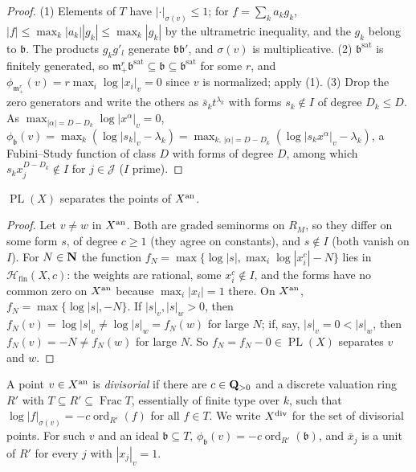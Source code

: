 \begin{proof}
(1) Elements of $T$ have $|\cdot|_{\sigma(v)}\le1$; for $f=\sum_ka_kg_k$, $|f|\le\max_k|a_k||g_k|\le\max_k|g_k|$ by the ultrametric
inequality, and the $g_k$ belong to $\mathfrak b$. The products $g_kg'_l$ generate $\mathfrak b\mathfrak b'$, and $\sigma(v)$ is multiplicative.
(2) $\mathfrak b^{\mathrm{sat}}$ is finitely generated, so $\mathfrak m_+^r\mathfrak b^{\mathrm{sat}}\subseteq\mathfrak b\subseteq\mathfrak b^{\mathrm{sat}}$ for some $r$,
and $\phi_{\mathfrak m_+^r}(v)=r\max_i\log|x_i|_v=0$ since $v$ is normalized; apply (1).
(3) Drop the zero generators and write the others as $\bar s_kt^{\lambda_k}$ with forms $s_k\notin I$ of degree $D_k\le D$. As
$\max_{|\alpha|=D-D_k}\log|x^\alpha|_v=0$,
$\phi_{\mathfrak b}(v)=\max_k(\log|s_k|_v-\lambda_k)=\max_{k,\,|\alpha|=D-D_k}(\log|s_kx^\alpha|_v-\lambda_k)$, a Fubini--Study function of class
$D$ with forms of degree $D$, among which $s_kx_j^{D-D_k}\notin I$ for $j\in\mathcal J$ ($I$ prime).
\end{proof}

\begin{lemma}\label{lem:sg-pl-separate}
\leanok
{}
$\operatorname{PL}(X)$ separates the points of $X^{\mathrm{an}}$.
\end{lemma}

\begin{proof}
Let $v\ne w$ in $X^{\mathrm{an}}$. Both are graded seminorms on $R_M$, so they differ on some form $s$, of degree $c\ge1$ (they agree
on constants), and $s\notin I$ (both vanish on $I$). For $N\in\mathbf{N}$ the function
$f_N=\max\{\log|s|,\max_i\log|x_i^c|-N\}$ lies in $\mathcal H_{\mathrm{fin}}(X,c)$: the weights are rational, some $x_i^c\notin I$, and
the forms have no common zero on $X^{\mathrm{an}}$ because $\max_i|x_i|=1$ there. On $X^{\mathrm{an}}$, $f_N=\max\{\log|s|,-N\}$. If
$|s|_v,|s|_w>0$, then $f_N(v)=\log|s|_v\ne\log|s|_w=f_N(w)$ for large $N$; if, say, $|s|_v=0<|s|_w$, then $f_N(v)=-N\ne f_N(w)$
for large $N$. So $f_N=f_N-0\in\operatorname{PL}(X)$ separates $v$ and $w$.
\end{proof}

\begin{definition}\label{def:sg-div}
\leanok
{}
A point $v\in X^{\mathrm{an}}$ is \emph{divisorial} if there are $c\in\mathbf{Q}_{>0}$ and a discrete valuation ring $R'$ with
$T\subseteq R'\subseteq\operatorname{Frac}T$, essentially of finite type over $k$, such that $\log|f|_{\sigma(v)}=-c\operatorname{ord}_{R'}(f)$ for all
$f\in T$. We write $X^{\mathrm{div}}$ for the set of divisorial points. For such $v$ and an ideal $\mathfrak b\subseteq T$,
$\phi_{\mathfrak b}(v)=-c\operatorname{ord}_{R'}(\mathfrak b)$, and $\bar x_j$ is a unit of $R'$ for every $j$ with $|x_j|_v=1$.
\end{definition}

